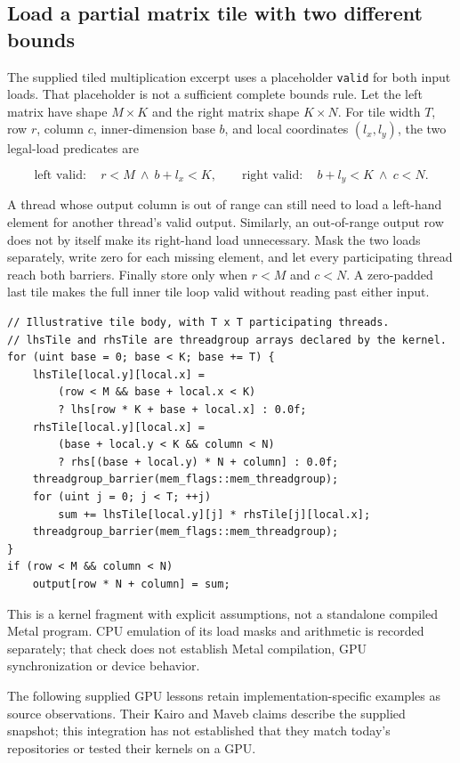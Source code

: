 \subsection{Load a partial matrix tile with two different bounds}\label{03-visual-computing-i-ch015-load-a-partial-matrix-tile-with-two-different-bounds}

The supplied tiled multiplication excerpt uses a placeholder \texttt{valid} for both input loads. That placeholder is not a sufficient complete bounds rule. Let the left matrix have shape \(M\times K\) and the right matrix shape \(K\times N\). For tile width \(T\), row \(r\), column \(c\), inner-dimension base \(b\), and local coordinates \((l_x,l_y)\), the two legal-load predicates are

\[
\text{left valid}:\quad r<M\ \land\ b+l_x<K,
\qquad
\text{right valid}:\quad b+l_y<K\ \land\ c<N.
\]

A thread whose output column is out of range can still need to load a left-hand element for another thread's valid output. Similarly, an out-of-range output row does not by itself make its right-hand load unnecessary. Mask the two loads separately, write zero for each missing element, and let every participating thread reach both barriers. Finally store only when \(r<M\) and \(c<N\). A zero-padded last tile makes the full inner tile loop valid without reading past either input.

\begin{verbatim}
// Illustrative tile body, with T x T participating threads.
// lhsTile and rhsTile are threadgroup arrays declared by the kernel.
for (uint base = 0; base < K; base += T) {
    lhsTile[local.y][local.x] =
        (row < M && base + local.x < K)
        ? lhs[row * K + base + local.x] : 0.0f;
    rhsTile[local.y][local.x] =
        (base + local.y < K && column < N)
        ? rhs[(base + local.y) * N + column] : 0.0f;
    threadgroup_barrier(mem_flags::mem_threadgroup);
    for (uint j = 0; j < T; ++j)
        sum += lhsTile[local.y][j] * rhsTile[j][local.x];
    threadgroup_barrier(mem_flags::mem_threadgroup);
}
if (row < M && column < N)
    output[row * N + column] = sum;
\end{verbatim}

This is a kernel fragment with explicit assumptions, not a standalone compiled Metal program. CPU emulation of its load masks and arithmetic is recorded separately; that check does not establish Metal compilation, GPU synchronization or device behavior.

The following supplied GPU lessons retain implementation-specific examples as source observations. Their Kairo and Maveb claims describe the supplied snapshot; this integration has not established that they match today's repositories or tested their kernels on a GPU.

